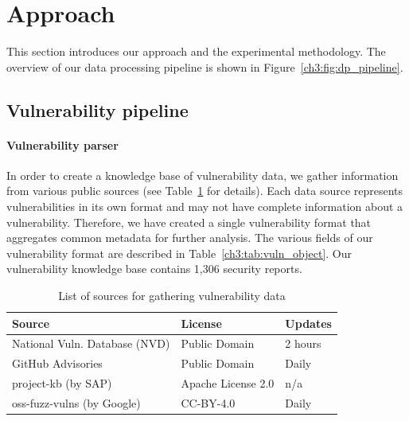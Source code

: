 \section{Approach}\label{ch3:sec:approach}
This section introduces our approach and the experimental methodology.
The overview of our data processing pipeline is shown in Figure~\ref{ch3:fig:dp_pipeline}.

\subsection{Vulnerability pipeline}
\paragraph{Vulnerability parser}
In order to create a knowledge base of vulnerability data, we gather information from various public sources (see Table~\ref{ch3:tab:vuln_sources} for details).
Each data source represents vulnerabilities in its own format and may not have complete information about a vulnerability.
Therefore, we have created a single vulnerability format that aggregates common metadata for further analysis.
The various fields of our vulnerability format are described in Table~\ref{ch3:tab:vuln_object}.
Our vulnerability knowledge base contains 1,306 security reports.%

\begin{table}
    \centering
    \caption{List of sources for gathering vulnerability data}
    \label{ch3:tab:vuln_sources}
  \begin{tabular}{@{}lll@{}} 
				\toprule
				\textbf{Source} & \textbf{License} & \textbf{Updates} \\
    \midrule
				 National Vuln. Database (NVD)  & Public Domain  & 2 hours  \\
				GitHub Advisories  & Public Domain  & Daily  \\
				project-kb (by SAP)  & Apache License 2.0  & n/a  \\
				oss-fuzz-vulns (by Google) & CC-BY-4.0 & Daily \\
				\bottomrule
		\end{tabular}
%
\end{table}

